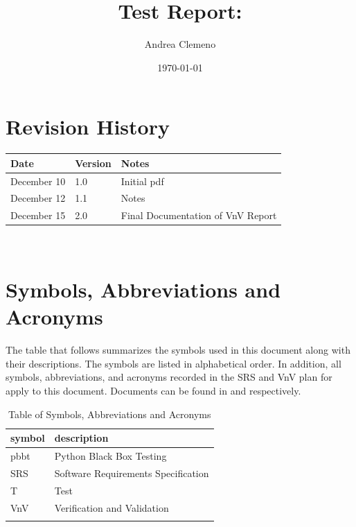 \documentclass[12pt, titlepage]{article}
\begin{document}
\title{Test Report: \progname{}} 
\author{Andrea Clemeno}
\date{\today}
	
\maketitle


\section{Revision History}

\begin{tabularx}{\textwidth}{p{3cm}p{2cm}X}
\toprule {\bf Date} & {\bf Version} & {\bf Notes}\\
\midrule
December 10 & 1.0 & Initial pdf\\
December 12 & 1.1 & Notes\\
December 15 & 2.0 & Final Documentation of VnV Report\\

\bottomrule
\end{tabularx}

~\newpage

\section{Symbols, Abbreviations and Acronyms}

The table that follows summarizes the symbols used in this document along with
their descriptions. The symbols are listed in alphabetical order. In addition, 
all symbols, abbreviations, and acronyms recorded in the SRS and VnV plan for 
\progname{} 
apply to this document. Documents can be found in \citet{SRS} and 
\citet{DiagnoseVNVplan} respectively.


\begin{table}[h!]
\renewcommand{\arraystretch}{1.2}
\noindent \begin{longtable*}{l p{8cm}} \toprule
\textbf{symbol} & \textbf{description}\\
\midrule 
pbbt & Python Black Box Testing
\\
SRS & Software Requirements Specification
\\
T & Test 
\\
VnV & Verification and Validation 
\\
&\\
\bottomrule

\end{longtable*}
\caption{Table of Symbols, Abbreviations and Acronyms}
\end{table}
\end{document}
